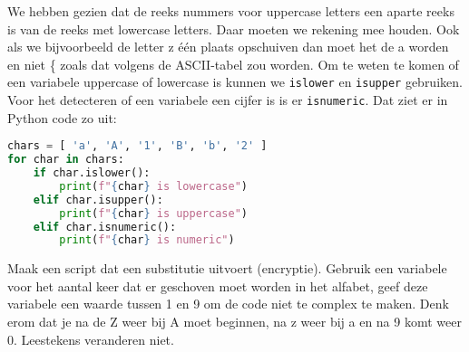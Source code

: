 We hebben gezien dat de reeks nummers voor uppercase letters een aparte reeks is van de reeks met lowercase letters. Daar moeten we rekening mee houden. Ook als we bijvoorbeeld de letter z \'e\'en plaats opschuiven dan moet het de a worden en niet \{ zoals dat volgens de ASCII-tabel zou worden. Om te weten te komen of een variabele uppercase of lowercase is kunnen we \texttt{islower} en \texttt{isupper} gebruiken. Voor het detecteren of een variabele een cijfer is is er \texttt{isnumeric}. Dat ziet er in Python code zo uit:
\begin{lstlisting}[language=python]
chars = [ 'a', 'A', '1', 'B', 'b', '2' ]
for char in chars:
    if char.islower():
        print(f"{char} is lowercase")
    elif char.isupper():
        print(f"{char} is uppercase")
    elif char.isnumeric():
        print(f"{char} is numeric")
\end{lstlisting}

Maak een script dat een substitutie uitvoert (encryptie). Gebruik een variabele voor het aantal keer dat er geschoven moet worden in het alfabet, geef deze variabele een waarde tussen 1 en 9 om de code niet te complex te maken. Denk erom dat je na de Z weer bij A moet beginnen, na z weer bij a en na 9 komt weer 0. Leestekens veranderen niet.

